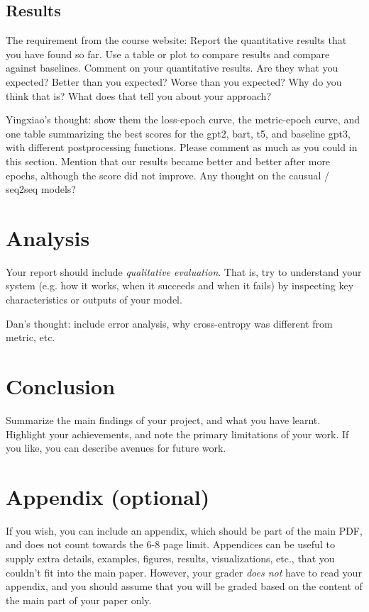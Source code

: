\documentclass{article}
\begin{document}
\color{red}
\subsection{Results}
\color{black}
The requirement from the course website: Report the quantitative results that you have found so far. Use a table or plot to compare results and compare against baselines.
Comment on your quantitative results. Are they what you expected? Better than you expected? Worse than you expected? Why do you think that is? What does that tell you about your approach?

Yingxiao's thought: show them the loss-epoch curve, the metric-epoch curve, and one table summarizing the best scores for the gpt2, bart, t5, and baseline gpt3, with different postprocessing functions. Please comment as much as you could in this section. Mention that our results became better and better after more epochs, although the score did not improve. Any thought on the causual / seq2seq models?


\section{Analysis}
Your report should include \textit{qualitative evaluation}. That is, try to understand your system (e.g. how it works, when it succeeds and when it fails) by inspecting key characteristics or outputs of your model.

Dan's thought: include error analysis, why cross-entropy was different from metric, etc.

\section{Conclusion}
Summarize the main findings of your project, and what you have learnt. Highlight your achievements, and note the primary limitations of your work. If you like, you can describe avenues for future work.






\appendix

\section{Appendix (optional)}
If you wish, you can include an appendix, which should be part of the main PDF, and does not count towards the 6-8 page limit.
Appendices can be useful to supply extra details, examples, figures, results, visualizations, etc., that you couldn't fit into the main paper. However, your grader \textit{does not} have to read your appendix, and you should assume that you will be graded based on the content of the main part of your paper only.
\end{document}
